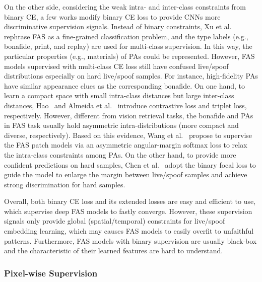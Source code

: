 \documentclass[10pt,journal,compsoc]{IEEEtran}
\begin{document}
On the other side, considering the weak intra- and inter-class constraints from binary CE, a few works modify binary CE loss to provide CNNs more discriminative supervision signals. Instead of binary constraints, Xu et al.~\cite{xu2020improving} rephrase FAS as a fine-grained classification problem, and the type labels (e.g., bonafide, print, and replay) are used for multi-class supervision. In this way, the particular properties (e.g., materials) of PAs could be represented. However, FAS models supervised with multi-class CE loss still have confused live/spoof distributions especially on hard live/spoof samples. For instance, high-fidelity PAs have similar appearance clues as the corresponding bonafide. On one hand, to learn a compact space with small intra-class distances but large inter-class distances, Hao~\cite{hao2019face} and Almeida et al.~\cite{almeida2020detecting} introduce contrastive loss and triplet loss, respectively. However, different from vision retrieval tasks, the bonafide and PAs in FAS task usually hold asymmetric intra-distributions (more compact and diverse, respectively). Based on this evidence, Wang et al.~\cite{wang2022patchnet} propose to supervise the FAS patch models via an asymmetric angular-margin softmax loss to relax the intra-class constraints among PAs. On the other hand, to provide more confident predictions on hard samples, Chen et al.~\cite{chen2021camera} adopt the binary focal loss to guide the model to enlarge the margin between live/spoof samples and achieve strong discrimination for hard samples.


Overall, both binary CE loss and its extended losses are easy and efficient to use, which supervise deep FAS models to fastly converge. However, these supervision signals only provide global (spatial/temporal) constraints for live/spoof embedding learning, which may causes FAS models to easily overfit to unfaithful patterns. Furthermore, FAS models with binary supervision are usually black-box and the characteristic of their learned features  are hard to understand.



\subsubsection{Pixel-wise Supervision}
\end{document}
